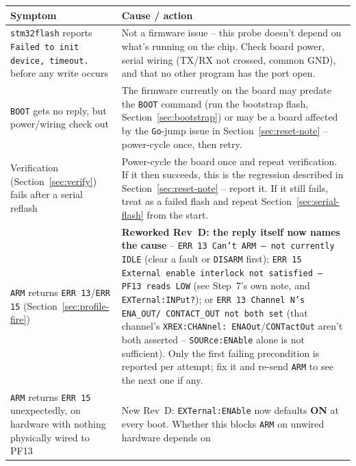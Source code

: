 \documentclass[11pt]{article}
\newcommand{\code}[1]{\texttt{#1}}
\begin{document}
\begin{longtable}{p{1.7in} p{3in}}
  \hline
  \textbf{Symptom} & \textbf{Cause / action} \\
  \hline
  \endhead
  \code{stm32flash} reports \code{Failed to init device, timeout.}
    before any write occurs &
    Not a firmware issue -- this probe doesn't depend on what's running
    on the chip. Check board power, serial wiring (TX\slash RX not
    crossed, common GND), and that no other program has the port
    open. \\
  \code{BOOT} gets no reply, but power/wiring check out &
    The firmware currently on the board may predate the \code{BOOT}
    command (run the bootstrap flash, Section~\ref{sec:bootstrap}) or
    may be a board affected by the \code{Go}-jump issue in
    Section~\ref{sec:reset-note} -- power-cycle once, then retry. \\
  Verification (Section~\ref{sec:verify}) fails after a serial reflash &
    Power-cycle the board once and repeat verification. If it then
    succeeds, this is the regression described in
    Section~\ref{sec:reset-note} -- report it. If it still fails, treat
    as a failed flash and repeat Section~\ref{sec:serial-flash} from the
    start. \\
  \code{ARM} returns \code{ERR 13}/\code{ERR 15}
    (Section~\ref{sec:profile-fire}) &
    \textbf{Reworked Rev~D: the reply itself now names the cause} --
    \code{ERR 13 Can't ARM -- not currently IDLE} (clear a fault or
    \code{DISARM} first); \code{ERR 15 External enable interlock not
    satisfied -- PF13 reads LOW} (see Step~7's own note, and
    \code{EXTernal:INPut?}); or \code{ERR 13 Channel~N's ENA\_OUT/
    CONTACT\_OUT not both set} (that channel's \code{XREX:CHANnel:
    ENAOut}/\code{CONTactOut} aren't both asserted --
    \code{SOURce:ENAble} alone is not sufficient). Only the first
    failing precondition is reported per attempt; fix it and re-send
    \code{ARM} to see the next one if any. \\
  \code{ARM} returns \code{ERR 15} unexpectedly, on hardware with
    nothing physically wired to PF13 &
    New Rev~D: \code{EXTernal:ENAble} now defaults \textbf{ON} at every
    boot. Whether this blocks \code{ARM} on unwired hardware depends on

\end{longtable}
\end{document}
